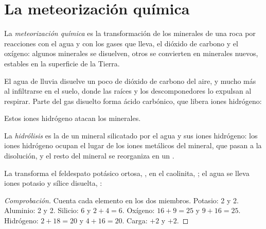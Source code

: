 \section{La meteorización química}

\begin{definition}\label{def:g10:soil-formation:chemical-weathering}
La \emph{meteorización química}
es la transformación de los minerales de una roca por reacciones con el agua
y con los gases que lleva, el dióxido de carbono y el oxígeno: algunos
minerales se disuelven, otros se convierten en minerales nuevos, estables en
la superficie de la Tierra.
\end{definition}

El agua de lluvia disuelve un poco de dióxido de carbono del aire, y mucho
más al infiltrarse en el suelo, donde las raíces y los descomponedores lo
expulsan al respirar. Parte del gas disuelto forma ácido carbónico, que
libera iones hidrógeno:
\begin{center}
\end{center}
Estos iones hidrógeno atacan los minerales.

\begin{definition}[Hidrólisis]\label{def:g10:soil-formation:hydrolysis}
La \emph{hidrólisis} es la 
de un mineral silicatado por el agua y sus iones hidrógeno: los iones
hidrógeno ocupan el lugar de los iones metálicos del mineral, que pasan a la
disolución, y el resto del mineral se reorganiza en un .
\end{definition}

\begin{proposition}\label{prop:g10:soil-formation:hydrolysis}
La  transforma el feldespato potásico ortosa, , en el
 caolinita, ; el agua se lleva iones
potasio y sílice disuelta, :
\begin{center}
\end{center}
\end{proposition}

\begin{proof}[Comprobación]
Cuenta cada elemento en los dos miembros. Potasio: 2 y 2. Aluminio: 2 y 2.
Silicio: 6 y $2 + 4 = 6$. Oxígeno: $16 + 9 = 25$ y $9 + 16 = 25$.
Hidrógeno: $2 + 18 = 20$ y $4 + 16 = 20$. Carga: $+2$ y $+2$.
\end{proof}

